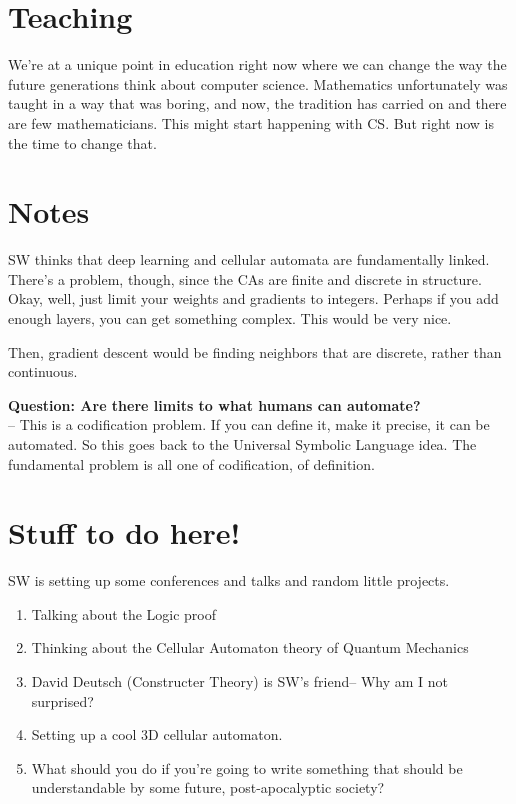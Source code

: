 \documentclass[11pt]{article}
\theoremstyle{definition}
\begin{document}
\section{Teaching}

We're at a unique point in education right now where we can change the way the future generations think about computer science. Mathematics unfortunately was taught in a way that was boring, and now, the tradition has carried on and there are few mathematicians. This might start happening with CS. But right now is the time to change that. 

\section{Notes}

SW thinks that deep learning and cellular automata are fundamentally linked. There's a problem, though, since the CAs are finite and discrete in structure. Okay, well, just limit your weights and gradients to integers. Perhaps if you add enough layers, you can get something complex. This would be very nice.

Then, gradient descent would be finding neighbors that are discrete, rather than continuous.

\textbf{Question: Are there limits to what humans can automate?}\\
-- This is a codification problem. If you can define it, make it precise, it can be automated. So this goes back to the Universal Symbolic Language idea. The fundamental problem is all one of codification, of definition. 

\section{Stuff to do here!}

SW is setting up some conferences and talks and random little projects.

\begin{enumerate}
\item Talking about the Logic proof
\item Thinking about the Cellular Automaton theory of Quantum Mechanics
\item David Deutsch (Constructer Theory) is SW's friend-- Why am I not surprised?
\item Setting up a cool 3D cellular automaton.
\item What should you do if you're going to write something that should be understandable by some future, post-apocalyptic society?
\end{enumerate}
\end{document}
